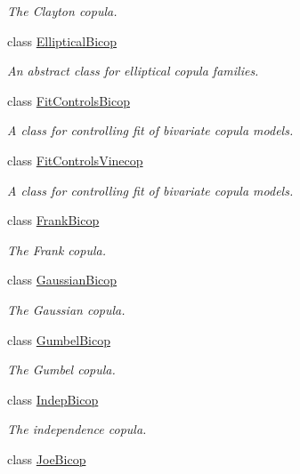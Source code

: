 \begin{DoxyCompactItemize}
\begin{DoxyCompactList}\small\item\em The Clayton copula. \end{DoxyCompactList}\item 
class \hyperlink{classvinecopulib_1_1_elliptical_bicop}{Elliptical\+Bicop}
\begin{DoxyCompactList}\small\item\em An abstract class for elliptical copula families. \end{DoxyCompactList}\item 
class \hyperlink{classvinecopulib_1_1_fit_controls_bicop}{Fit\+Controls\+Bicop}
\begin{DoxyCompactList}\small\item\em A class for controlling fit of bivariate copula models. \end{DoxyCompactList}\item 
class \hyperlink{classvinecopulib_1_1_fit_controls_vinecop}{Fit\+Controls\+Vinecop}
\begin{DoxyCompactList}\small\item\em A class for controlling fit of bivariate copula models. \end{DoxyCompactList}\item 
class \hyperlink{classvinecopulib_1_1_frank_bicop}{Frank\+Bicop}
\begin{DoxyCompactList}\small\item\em The Frank copula. \end{DoxyCompactList}\item 
class \hyperlink{classvinecopulib_1_1_gaussian_bicop}{Gaussian\+Bicop}
\begin{DoxyCompactList}\small\item\em The Gaussian copula. \end{DoxyCompactList}\item 
class \hyperlink{classvinecopulib_1_1_gumbel_bicop}{Gumbel\+Bicop}
\begin{DoxyCompactList}\small\item\em The Gumbel copula. \end{DoxyCompactList}\item 
class \hyperlink{classvinecopulib_1_1_indep_bicop}{Indep\+Bicop}
\begin{DoxyCompactList}\small\item\em The independence copula. \end{DoxyCompactList}\item 
class \hyperlink{classvinecopulib_1_1_joe_bicop}{Joe\+Bicop}

\end{DoxyCompactItemize}
